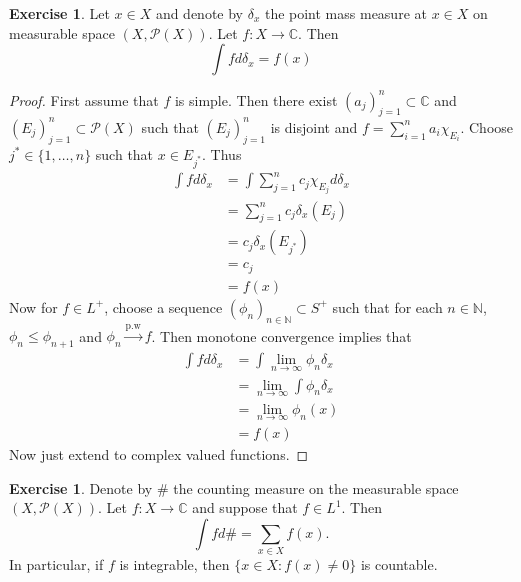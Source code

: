 \documentclass[12pt]{amsart}
\theoremstyle{definition}
\newtheorem{ex}[definition]{Exercise}
\newcommand{\del}{\delta}
\newcommand{\C}{\mathbb{C}}
\newcommand{\N}{\mathbb{N}}
\newcommand{\MP}{\mathcal{P}}
\newcommand{\limn}{\lim \limits_{n \rightarrow \infty}}
\newcommand{\lex}[1]{\label{ex:#1}}
\begin{document}
	\begin{ex} \lex{00000} 
		Let $x \in X$ and denote by $\del_x$ the point mass measure at $x \in X$ on  measurable space $(X, \MP(X))$. Let $f:X \rightarrow \C$. Then $$\int f d \del_x = f(x)$$  
	\end{ex}
	
	\begin{proof}
		First assume that $f$ is simple. Then there exist $(a_j)_{j=1}^n \subset \C$ and $(E_j)_{j=1}^n \subset \MP(X)$ such that $(E_j)_{j=1}^n$ is disjoint and $f = \sum_{i = 1}^n a_i\chi_{E_i}$. Choose $j^* \in \{1, \ldots, n\}$ such that $x \in E_{j^*}$. Thus 
		\begin{align*}
		\int f d\del_x 
		&= \int \sum_{j=1}^n c_j \chi_{E_j} d \del_x \\
		&= \sum_{j=1}^n c_j \del_x(E_j) \\
		&= c_j \del_x(E_{j^*}) \\
		&= c_j \\
		&= f(x)
		\end{align*} 
		Now for $f \in L^+$, choose a sequence $(\phi_n)_{n \in \N} \subset S^+$ such that for each $n \in \N$, $\phi_n \leq \phi_{n+1}$ and $\phi_n \xrightarrow{\text{p.w}} f$. Then monotone convergence implies that 
		\begin{align*}
		\int f d \del_x 
		&= \int \limn \phi_n  \del_x \\
		&= \limn \int \phi_n \del_x \\
		&= \limn \phi_n(x) \\
		&= f(x) 
		\end{align*}
		Now just extend to complex valued functions.
		
	\end{proof}
	
	\begin{ex} \lex{00000} 
		Denote by $\#$ the counting measure on the measurable space $(X, \MP(X))$. Let $f:X \rightarrow \C$ and suppose that $f \in L^1$. Then $$\int f d\# = \sum_{x \in X}f(x).$$ In particular, if $f$ is integrable, then $\{x \in X: f(x) \neq 0\}$ is countable.
	\end{ex}
	
\end{document}
